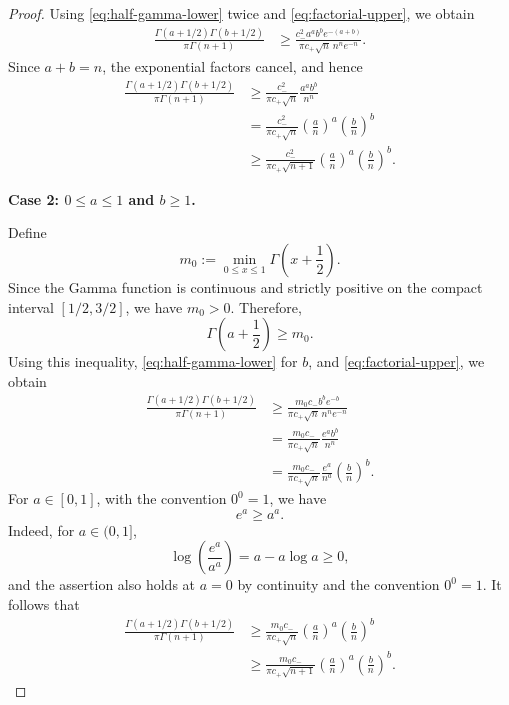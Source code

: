 \documentclass[12pt]{article}
\theoremstyle{spaced}
\theoremstyle{remark}
\begin{document}
\begin{proof}
Using \eqref{eq:half-gamma-lower} twice and
\eqref{eq:factorial-upper}, we obtain
\begin{align*}
\frac{
    \Gamma(a+1/2)\Gamma(b+1/2)
}{
    \pi\Gamma(n+1)
}
&\ge
\frac{
    c_-^2a^ab^be^{-(a+b)}
}{
    \pi c_+\sqrt n\,n^ne^{-n}
}.
\end{align*}
Since \(a+b=n\), the exponential factors cancel, and hence
\begin{align}
\frac{
    \Gamma(a+1/2)\Gamma(b+1/2)
}{
    \pi\Gamma(n+1)
}
&\ge
\frac{c_-^2}{\pi c_+\sqrt n}
\frac{a^ab^b}{n^n}
\nonumber\\
&=
\frac{c_-^2}{\pi c_+\sqrt n}
\left(\frac an\right)^a
\left(\frac bn\right)^b
\nonumber\\
&\ge
\frac{c_-^2}{\pi c_+\sqrt{n+1}}
\left(\frac an\right)^a
\left(\frac bn\right)^b.
\label{eq:interior-gamma-bound}
\end{align}

\medskip
\noindent
\textbf{Case 2: \(0\le a\le1\) and \(b\ge1\).}

Define
\[
    m_0
    :=
    \min_{0\le x\le1}
    \Gamma\left(x+\frac12\right).
\]
Since the Gamma function is continuous and strictly positive on the compact
interval \([1/2,3/2]\), we have \(m_0>0\). Therefore,
\[
    \Gamma\left(a+\frac12\right)\ge m_0.
\]
Using this inequality, \eqref{eq:half-gamma-lower} for \(b\), and
\eqref{eq:factorial-upper}, we obtain
\begin{align*}
\frac{
    \Gamma(a+1/2)\Gamma(b+1/2)
}{
    \pi\Gamma(n+1)
}
&\ge
\frac{
    m_0c_-b^be^{-b}
}{
    \pi c_+\sqrt n\,n^ne^{-n}
}\\
&=
\frac{m_0c_-}{\pi c_+\sqrt n}
\frac{e^ab^b}{n^n}
\\
&=
\frac{m_0c_-}{\pi c_+\sqrt n}
\frac{e^a}{n^a}
\left(\frac bn\right)^b.
\end{align*}
For \(a\in[0,1]\), with the convention \(0^0=1\), we have
\[
    e^a\ge a^a.
\]
Indeed, for \(a\in(0,1]\),
\[
    \log\left(\frac{e^a}{a^a}\right)
    =
    a-a\log a
    \ge0,
\]
and the assertion also holds at \(a=0\) by continuity and the convention
\(0^0=1\). It follows that
\begin{align}
\frac{
    \Gamma(a+1/2)\Gamma(b+1/2)
}{
    \pi\Gamma(n+1)
}
&\ge
\frac{m_0c_-}{\pi c_+\sqrt n}
\left(\frac an\right)^a
\left(\frac bn\right)^b
\nonumber\\
&\ge
\frac{m_0c_-}{\pi c_+\sqrt{n+1}}
\left(\frac an\right)^a
\left(\frac bn\right)^b.
\label{eq:left-boundary-gamma-bound}
\end{align}


\end{proof}
\end{document}
